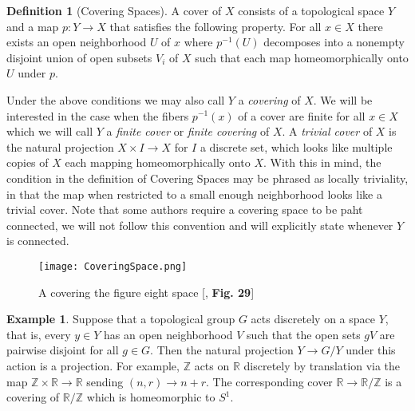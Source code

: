 \documentclass{article}
\theoremstyle{definition}
\newtheorem{definition}[theorem]{Definition}
\newtheorem{example}[theorem]{Example}
\theoremstyle{remark}
\theoremstyle{plain}
\newcommand{\R}{\mathbb{R}}
\newcommand{\Z}{\mathbb{Z}}
\begin{document}
\begin{definition}[Covering Spaces]
A cover of $X$ consists of a topological space $Y$ and a map $p:Y \to X$ that satisfies the following property. 
	For all $x \in X$ there exists an open neighborhood $U$ of $x$ where $p^{-1}(U)$ decomposes into a nonempty disjoint union of open subsets $V_i$ of $X$ such that each map homeomorphically onto $U$ under $p$.
\end{definition}

Under the above conditions we may also call $Y$ a \textit{covering} of $X$.
We will be interested in the case when the fibers $p^{-1}(x)$ of a cover are finite for all $x \in X$ which we will call $Y$ a \textit{finite cover} or \textit{finite covering} of $X$.
A \textit{trivial cover} of $X$ is the natural projection $X \times I \to X$ for $I$ a discrete set, which looks like multiple copies of $X$ each mapping homeomorphically onto $X$.
With this in mind, the condition in the definition of Covering Spaces may be phrased as locally triviality, in that the map when restricted to a small enough neighborhood looks like a trivial cover.
Note that some authors require a covering space to be paht connected, we will not follow this convention and will explicitly state whenever $Y$ is connected.


\begin{figure}[ht!]
\centering
\texttt{[image: CoveringSpace.png]}

\caption*{A covering the figure eight space [\cite{FomenkoFuchs}, \textbf{Fig. 29}]}
\end{figure}

\begin{example} Suppose that a topological group $G$ acts discretely on a space $Y$, that is, every $y \in Y$ has an open neighborhood $V$ such that the open sets $gV$ are pairwise disjoint for all $g  \in G$.
	Then the natural projection $Y \to G/Y$ under this action is a projection.
	For example, $\Z$ acts on $\R$ discretely by translation via the map $\Z \times \R \to \R$ sending $(n,r) \to n+r$.
	The corresponding cover $\R \to \R/\Z$ is a covering of $\R/\Z$ which is homeomorphic to $S^1$.
\end{example}
\end{document}
